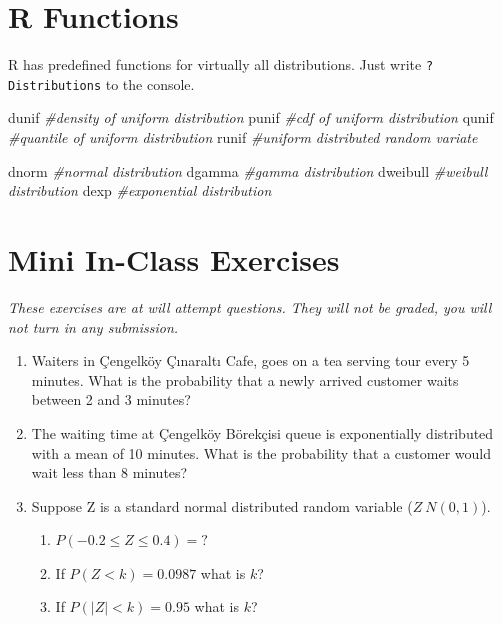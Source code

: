 \documentclass[]{book}
\newenvironment{Shaded}{\begin{snugshade}}{\end{snugshade}}
\newcommand{\CommentTok}[1]{\textcolor[rgb]{0.56,0.35,0.01}{\textit{#1}}}
\newcommand{\NormalTok}[1]{#1}
\providecommand{\tightlist}{%
  \setlength{\itemsep}{0pt}\setlength{\parskip}{0pt}}
\theoremstyle{definition}
\theoremstyle{definition}
\theoremstyle{definition}
\theoremstyle{remark}
\begin{document}
\hypertarget{r-functions}{%
\section{R Functions}\label{r-functions}}

R has predefined functions for virtually all distributions. Just write
\texttt{?Distributions} to the console.

\begin{Shaded}
\begin{Highlighting}[]
\NormalTok{dunif }\CommentTok{#density of uniform distribution}
\NormalTok{punif }\CommentTok{#cdf of uniform distribution}
\NormalTok{qunif }\CommentTok{#quantile of uniform distribution}
\NormalTok{runif }\CommentTok{#uniform distributed random variate}

\NormalTok{dnorm }\CommentTok{#normal distribution}
\NormalTok{dgamma }\CommentTok{#gamma distribution}
\NormalTok{dweibull }\CommentTok{#weibull distribution}
\NormalTok{dexp }\CommentTok{#exponential distribution}
\end{Highlighting}
\end{Shaded}

\hypertarget{mini-in-class-exercises}{%
\section{Mini In-Class Exercises}\label{mini-in-class-exercises}}

\emph{These exercises are at will attempt questions. They will not be
graded, you will not turn in any submission.}

\begin{enumerate}
\def\labelenumi{\arabic{enumi}.}
\item
  Waiters in Çengelköy Çınaraltı Cafe, goes on a tea serving tour every
  5 minutes. What is the probability that a newly arrived customer waits
  between 2 and 3 minutes?
\item
  The waiting time at Çengelköy Börekçisi queue is exponentially
  distributed with a mean of 10 minutes. What is the probability that a
  customer would wait less than 8 minutes?
\item
  Suppose Z is a standard normal distributed random variable
  (\(Z ~ N(0,1)\)).

  \begin{enumerate}
  \def\labelenumii{\alph{enumii}.}
  \tightlist
  \item
    \(P(-0.2 \le Z \le 0.4) = ?\)
  \item
    If \(P(Z < k) = 0.0987\) what is \(k\)?
  \item
    If \(P(|Z| < k) = 0.95\) what is \(k\)?
  \end{enumerate}
\end{enumerate}


\end{document}
